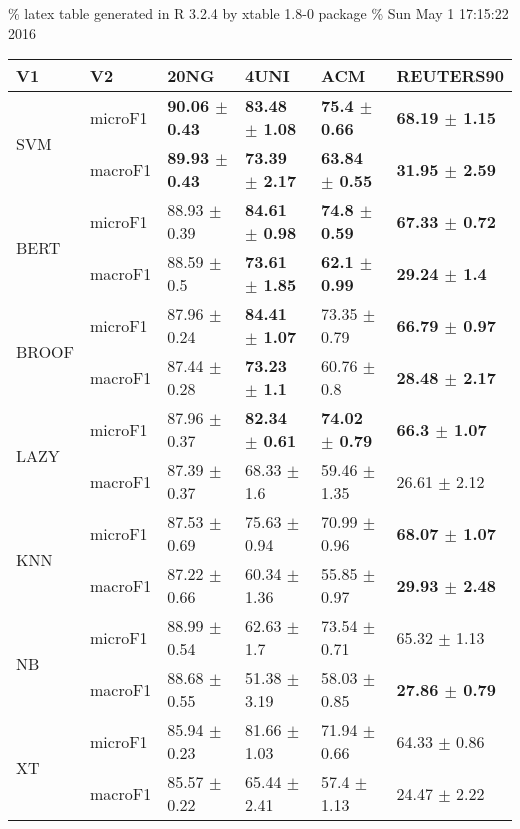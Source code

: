 \documentclass[]{article}
\begin{document}
\% latex table generated in R 3.2.4 by xtable 1.8-0 package \% Sun May 1
17:15:22 2016

\begin{table}[ht]
\centering
\begin{tabular}{llllll}
  \hline
V1 & V2 & 20NG & 4UNI & ACM & REUTERS90 \\ 
  \cline{3-6} \hline
\multirow{2}{*}{SVM} & microF1 & \bf{90.06 $\pm$  0.43} & \bf{83.48 $\pm$  1.08} & \bf{75.4 $\pm$  0.66} & \bf{68.19 $\pm$  1.15} \\ 
   & macroF1 & \bf{89.93 $\pm$  0.43} & \bf{73.39 $\pm$  2.17} & \bf{63.84 $\pm$  0.55} & \bf{31.95 $\pm$  2.59} \\ 
   \cline{3-6}\multirow{2}{*}{BERT} & microF1 & 88.93 $\pm$  0.39 & \bf{84.61 $\pm$  0.98} & \bf{74.8 $\pm$  0.59} & \bf{67.33 $\pm$  0.72} \\ 
   & macroF1 & 88.59 $\pm$  0.5 & \bf{73.61 $\pm$  1.85} & \bf{62.1 $\pm$  0.99} & \bf{29.24 $\pm$  1.4} \\ 
   \cline{3-6}\multirow{2}{*}{BROOF} & microF1 & 87.96 $\pm$  0.24 & \bf{84.41 $\pm$  1.07} & 73.35 $\pm$  0.79 & \bf{66.79 $\pm$  0.97} \\ 
   & macroF1 & 87.44 $\pm$  0.28 & \bf{73.23 $\pm$  1.1} & 60.76 $\pm$  0.8 & \bf{28.48 $\pm$  2.17} \\ 
   \cline{3-6}\multirow{2}{*}{LAZY} & microF1 & 87.96 $\pm$  0.37 & \bf{82.34 $\pm$  0.61} & \bf{74.02 $\pm$  0.79} & \bf{66.3 $\pm$  1.07} \\ 
   & macroF1 & 87.39 $\pm$  0.37 & 68.33 $\pm$  1.6 & 59.46 $\pm$  1.35 & 26.61 $\pm$  2.12 \\ 
   \cline{3-6}\multirow{2}{*}{KNN} & microF1 & 87.53 $\pm$  0.69 & 75.63 $\pm$  0.94 & 70.99 $\pm$  0.96 & \bf{68.07 $\pm$  1.07} \\ 
   & macroF1 & 87.22 $\pm$  0.66 & 60.34 $\pm$  1.36 & 55.85 $\pm$  0.97 & \bf{29.93 $\pm$  2.48} \\ 
   \cline{3-6}\multirow{2}{*}{NB} & microF1 & 88.99 $\pm$  0.54 & 62.63 $\pm$  1.7 & 73.54 $\pm$  0.71 & 65.32 $\pm$  1.13 \\ 
   & macroF1 & 88.68 $\pm$  0.55 & 51.38 $\pm$  3.19 & 58.03 $\pm$  0.85 & \bf{27.86 $\pm$  0.79} \\ 
   \cline{3-6}\multirow{2}{*}{XT} & microF1 & 85.94 $\pm$  0.23 & 81.66 $\pm$  1.03 & 71.94 $\pm$  0.66 & 64.33 $\pm$  0.86 \\ 
   & macroF1 & 85.57 $\pm$  0.22 & 65.44 $\pm$  2.41 & 57.4 $\pm$  1.13 & 24.47 $\pm$  2.22 \\ 

\end{tabular}
\end{table}
\end{document}
